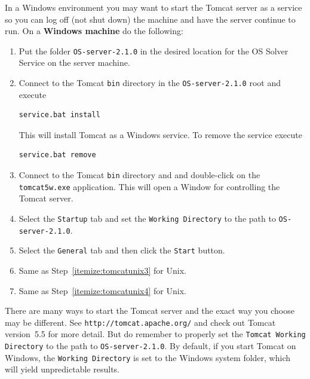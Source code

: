 \documentclass[11pt]{article}
\renewcommand{\_}{{\char"5F}}
\renewcommand{\{}{{\char"7B}}
\renewcommand{\}}{{\char"7D}}
\renewcommand{\^}{{\char"0D}}
\renewcommand{\'}{{\char"0D}}
\newcommand{\UrlTomcat}{http://tomcat.apache.org/}
\begin{document}
\begin{enumerate}[Step 1:]
In a Windows environment you may want to start the Tomcat server as a service so you can log off (not shut down)
the machine and have the server continue to run. On a {\bf Windows machine} do the following:

\begin{enumerate}[Step 1.]

\item{}  Put the folder  {\tt OS-server-2.1.0}   in the desired location for the OS Solver Service on the server machine.

\item{} \label{itemize:tomcatwin2}  Connect to the Tomcat {\tt bin} directory in the {\tt OS-server-2.1.0} root and execute
\begin{verbatim}
service.bat install
\end{verbatim}
This will install Tomcat as a Windows service.  To remove the service execute
\begin{verbatim}
service.bat remove
\end{verbatim}

\item{}  \label{itemize:tomcatwin3}  Connect to the Tomcat {\tt bin} directory and and double-click on the
{\tt tomcat5w.exe} application.  This will open a Window for controlling the Tomcat server.

\item{}  \label{itemize:tomcatwin4} Select the {\tt Startup} tab and set the {\tt Working Directory}
to the path to {\tt OS-server-2.1.0}.

\item{}  \label{itemize:tomcatwin5} Select the {\tt General} tab and then click the {\tt Start} button.

\item{}  Same as Step~\ref{itemize:tomcatunix3} for Unix.

\item{}  Same as Step~\ref{itemize:tomcatunix4} for Unix.

\end{enumerate}

\vskip 8pt

There are many ways to start the Tomcat server and the exact way you choose may be different.
See {\tt\UrlTomcat} and check out Tomcat version~5.5 for more detail. But do remember to
properly set the {\tt Tomcat Working Directory} to the path to {\tt OS-server-2.1.0}. By default,
if you start Tomcat on Windows, the {\tt Working Directory} is set to the Windows system folder,
which will yield unpredictable results.


\end{enumerate}
\end{document}
